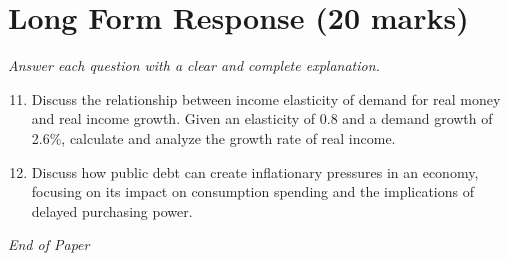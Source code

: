 \documentclass[12pt]{article}
\begin{document}
\section*{Long Form Response (20 marks)}
\textit{Answer each question with a clear and complete explanation.}
\begin{enumerate}[label=\arabic*.]
\setcounter{enumi}{10}
\item Discuss the relationship between income elasticity of demand for real money and real income growth. Given an elasticity of 0.8 and a demand growth of 2.6\%, calculate and analyze the growth rate of real income.
\item Discuss how public debt can create inflationary pressures in an economy, focusing on its impact on consumption spending and the implications of delayed purchasing power.
\end{enumerate}

\vfill
\noindent\textit{End of Paper}
\end{document}
